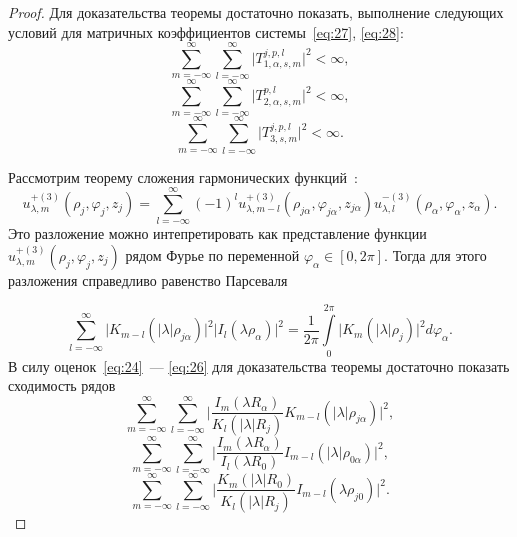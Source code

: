 \begin{proof}
Для доказательства теоремы достаточно показать, выполнение следующих условий для матричных коэффициентов системы~\eqref{eq:27}, \eqref{eq:28}:
\begin{equation}
\sum\limits_{m=-\infty}^\infty\sum\limits_{l=-\infty}^\infty\bigg|T_{1,\alpha,s,m}^{j,p,l}\bigg|^2<\infty,
\end{equation}
\begin{equation}
\sum\limits_{m=-\infty}^\infty\sum\limits_{l=-\infty}^\infty\bigg|T_{2,\alpha,s,m}^{p,l}\bigg|^2<\infty,
\end{equation}
\begin{equation}
\sum\limits_{m=-\infty}^\infty\sum\limits_{l=-\infty}^\infty\bigg|T_{3,s,m}^{j,p,l}\bigg|^2<\infty.
\end{equation}
\par Рассмотрим теорему сложения гармонических функций~\cite{Nikolaev2011}:
\begin{equation}
u_{\lambda,m}^{+(3)}(\rho_j,\varphi_j,z_j)=\sum\limits_{l=-\infty}^\infty(-1)^l u_{\lambda,m-l}^{+(3)}(\rho_{j\alpha},\varphi_{j\alpha},z_{j\alpha}) u_{\lambda,l}^{-(3)}(\rho_\alpha,\varphi_\alpha,z_\alpha).
\end{equation}
Это разложение можно интепретировать как представление функции $u_{\lambda,m}^{+(3)}(\rho_j,\varphi_j,z_j)$ рядом Фурье по переменной $\varphi_\alpha\in[0,2\pi]$. Тогда для этого разложения справедливо равенство Парсеваля{\sloppy\par}
\begin{equation}
\sum\limits_{l=-\infty}^\infty\bigg|K_{m-l}(|\lambda|\rho_{j\alpha})\bigg|^2\bigg|I_l(\lambda\rho_\alpha)\bigg|^2=\frac{1}{2\pi}\int\limits_0^{2\pi}\bigg|K_m(|\lambda|\rho_j)\bigg|^2d\varphi_\alpha.
\label{eq:32}
\end{equation}
В силу оценок~\eqref{eq:24}~--- \eqref{eq:26} для доказательства теоремы достаточно показать сходимость рядов
\begin{equation}
\sum\limits_{m=-\infty}^\infty\sum\limits_{l=-\infty}^\infty\bigg|\frac{I_m(\lambda R_\alpha)}{K_l(|\lambda|R_j)}K_{m-l}(|\lambda|\rho_{j\alpha})\bigg|^2,
\label{eq:29}
\end{equation}
\begin{equation}
\sum\limits_{m=-\infty}^\infty\sum\limits_{l=-\infty}^\infty\bigg|\frac{I_m(\lambda R_\alpha)}{I_l(\lambda R_0)}I_{m-l}(|\lambda|\rho_{0\alpha})\bigg|^2,
\label{eq:30}
\end{equation}
\begin{equation}
\sum\limits_{m=-\infty}^\infty\sum\limits_{l=-\infty}^\infty\bigg|\frac{K_m(|\lambda|R_0)}{K_l(|\lambda|R_j)}I_{m-l}(\lambda\rho_{j0})\bigg|^2.

\end{equation}
\end{proof}
